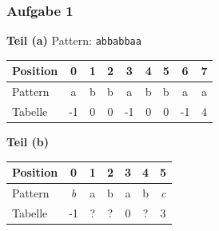 \documentclass{beamer}
\begin{document}
\begin{frame} \frametitle{Aufgabe 1}
	\textbf{Teil (a)} \hspace{3em}
	Pattern: {\large \texttt{abbabbaa}} \\[1em]
	\pause
	
	\begin{center}
		\begin{tabular}{l|cccccccc}
			Position &  0 &  1 &  2 &  3 &  4 &  5 &  6 &  7  \\ \hline
			Pattern  &  a &  b &  b &  a &  b &  b &  a &  a  \\ \hline
			Tabelle  & -1 &  0 &  0 & -1 &  0 &  0 & -1 &  4  \\
		\end{tabular}
	\end{center}
	
	\pause

	\textbf{Teil (b)}
	\begin{center}
		\begin{tabular}{l|cccccc}
			Position &  0 &  1 &  2 &  3 &  4 &  5 \\ \hline
			Pattern  &  \textit{b} &  a &  b &  a &  b &  \textit{c} \\ \hline
			Tabelle  & -1 &  ? & ? &  0 &  ? &  3 \\
		\end{tabular}
	\end{center}
	
\end{frame}

\end{document}
